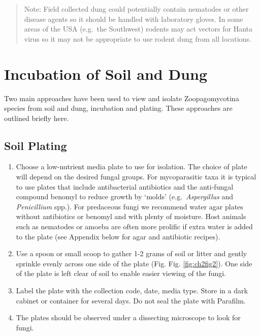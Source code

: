 \documentclass[]{book}
\providecommand{\tightlist}{%
  \setlength{\itemsep}{0pt}\setlength{\parskip}{0pt}}
\begin{document}
\begin{quote}
Note:
Field collected dung could potentially contain nematodes or other disease agents so it should be handled with laboratory gloves. In some areas of the USA (e.g.~the Southwest) rodents may act vectors for Hanta virus so it may not be appropriate to use rodent dung from all locations.
\end{quote}

\hypertarget{incubation-of-soil-and-dung}{%
\section{Incubation of Soil and Dung}\label{incubation-of-soil-and-dung}}

Two main approaches have been used to view and isolate Zoopagomycotina species from soil and dung, incubation and plating. These approaches are outlined briefly here.

\hypertarget{soil-plating}{%
\subsection{Soil Plating}\label{soil-plating}}

\begin{enumerate}
\def\labelenumi{\arabic{enumi}.}
\tightlist
\item
  Choose a low-nutrient media plate to use for isolation. The choice of plate will depend on the desired fungal groups. For mycoparasitic taxa it is typical to use plates that include antibacterial antibiotics and the anti-fungal compound benomyl to reduce growth by `molds' (e.g.~\emph{Aspergillus} and \emph{Penicillium} spp.). For predaceous fungi we recommend water agar plates without antibiotics or benomyl and with plenty of moisture. Host animals such as nematodes or amoeba are often more prolific if extra water is added to the plate (see Appendix below for agar and antibiotic recipes).
\item
  Use a spoon or small scoop to gather 1-2 grams of soil or litter and gently sprinkle evenly across one side of the plate (Fig. Fig. \ref{fig:ch2fig2}). One side of the plate is left clear of soil to enable easier viewing of the fungi.
\item
  Label the plate with the collection code, date, media type. Store in a dark cabinet or container for several days. Do {not} seal the plate with Parafilm.
\item
  The plates should be observed under a dissecting microscope to look for fungi.
\end{enumerate}
\end{document}
